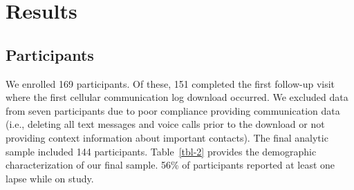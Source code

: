 \documentclass[
  letterpaper,
  DIV=11,
  numbers=noendperiod]{scrartcl}
\begin{document}
\section{Results}\label{results}

\subsection{Participants}\label{participants}

We enrolled 169 participants. Of these, 151 completed the first
follow-up visit where the first cellular communication log download
occurred. We excluded data from seven participants due to poor
compliance providing communication data (i.e., deleting all text
messages and voice calls prior to the download or not providing context
information about important contacts). The final analytic sample
included 144 participants. Table~\ref{tbl-2} provides the demographic
characterization of our final sample. 56\% of participants reported at
least one lapse while on study.
\end{document}
